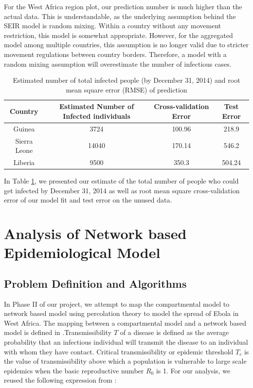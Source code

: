 \documentclass[10pt, journal,onecolumn]{IEEEtran}
\begin{document}
For the West Africa region plot, our prediction number is much higher than the actual data. This is understandable, as the underlying assumption behind the SEIR model is random mixing.  Within a country without any movement restriction, this model is somewhat appropriate. However, for the aggregated model among multiple countries, this assumption is no longer valid due to stricter movement regulations between country borders. Therefore, a model with a random mixing assumption will overestimate the number of infectious cases.


\begin{table}[h]
\caption{Estimated number of total infected people (by December 31, 2014) and root mean square error (RMSE) of prediction} 
\centering
\begin{tabular}{|c|c|c|c|}
\hline 
Country & Estimated Number of Infected individuals & Cross-validation Error & Test Error 
\tabularnewline
\hline 
\hline 
Guinea & 3724 & 100.96 & 218.9\tabularnewline
\hline 
Sierra Leone & 14040 & 170.14 & 546.2\tabularnewline
\hline 
Liberia & 9500 & 350.3 & 504.24\tabularnewline
\hline 
\end{tabular}
\label{Tb:prediction}

\end{table}

In Table \ref{Tb:prediction}, we presented our estimate of the total number of people who could get infected by December 31, 2014 as well as root mean square cross-validation error of our model fit and test error on the unused data. 


\section{Analysis of Network based Epidemiological Model}
\label{sec:NetworkModel}


\subsection{{Problem Definition and Algorithms}}

In Phase II of our project, we attempt  to map the compartmental model to network based model  using percolation theory to model the spread of Ebola in West Africa. The mapping between a compartmental model and a network based model is defined in \citep{meyers2005network}.Transmissibility $T$ of a disease is defined as the average probability that an infectious individual will transmit the disease to an individual with whom they have contact. Critical transmissibility or epidemic threshold $T_c$ is the value of transmissibility above which a population is vulnerable to large scale  epidemics when the basic reproductive number $R_0$ is 1. For our analysis, we reused the following expression from \citep{meyers2005network}:
\end{document}

